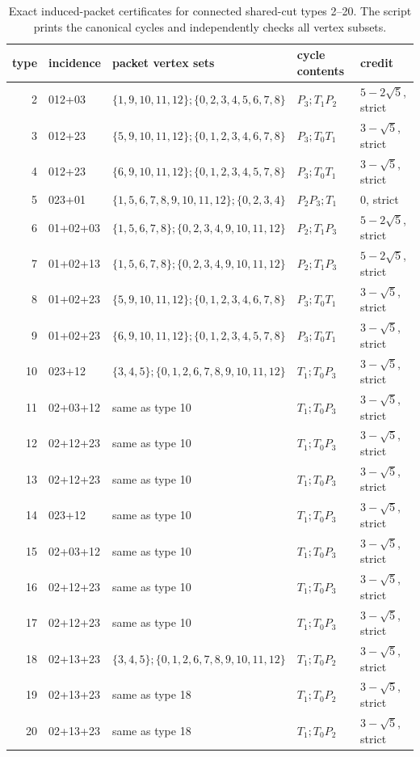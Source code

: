\documentclass[11pt]{article}
\theoremstyle{remark}
\begin{document}
\begin{table}[p]
\centering\scriptsize
\begin{tabular}{rlllp{2.3cm}}
type&incidence&packet vertex sets&cycle contents&credit\\\hline
2&012+03&$\{1,9,10,11,12\};\{0,2,3,4,5,6,7,8\}$&$P_3;T_1P_2$&$5-2\sqrt5$, strict\\
3&012+23&$\{5,9,10,11,12\};\{0,1,2,3,4,6,7,8\}$&$P_3;T_0T_1$&$3-\sqrt5$, strict\\
4&012+23&$\{6,9,10,11,12\};\{0,1,2,3,4,5,7,8\}$&$P_3;T_0T_1$&$3-\sqrt5$, strict\\
5&023+01&$\{1,5,6,7,8,9,10,11,12\};\{0,2,3,4\}$&$P_2P_3;T_1$&$0$, strict\\
6&01+02+03&$\{1,5,6,7,8\};\{0,2,3,4,9,10,11,12\}$&$P_2;T_1P_3$&$5-2\sqrt5$, strict\\
7&01+02+13&$\{1,5,6,7,8\};\{0,2,3,4,9,10,11,12\}$&$P_2;T_1P_3$&$5-2\sqrt5$, strict\\
8&01+02+23&$\{5,9,10,11,12\};\{0,1,2,3,4,6,7,8\}$&$P_3;T_0T_1$&$3-\sqrt5$, strict\\
9&01+02+23&$\{6,9,10,11,12\};\{0,1,2,3,4,5,7,8\}$&$P_3;T_0T_1$&$3-\sqrt5$, strict\\
10&023+12&$\{3,4,5\};\{0,1,2,6,7,8,9,10,11,12\}$&$T_1;T_0P_3$&$3-\sqrt5$, strict\\
11&02+03+12&same as type 10&$T_1;T_0P_3$&$3-\sqrt5$, strict\\
12&02+12+23&same as type 10&$T_1;T_0P_3$&$3-\sqrt5$, strict\\
13&02+12+23&same as type 10&$T_1;T_0P_3$&$3-\sqrt5$, strict\\
14&023+12&same as type 10&$T_1;T_0P_3$&$3-\sqrt5$, strict\\
15&02+03+12&same as type 10&$T_1;T_0P_3$&$3-\sqrt5$, strict\\
16&02+12+23&same as type 10&$T_1;T_0P_3$&$3-\sqrt5$, strict\\
17&02+12+23&same as type 10&$T_1;T_0P_3$&$3-\sqrt5$, strict\\
18&02+13+23&$\{3,4,5\};\{0,1,2,6,7,8,9,10,11,12\}$&$T_1;T_0P_2$&$3-\sqrt5$, strict\\
19&02+13+23&same as type 18&$T_1;T_0P_2$&$3-\sqrt5$, strict\\
20&02+13+23&same as type 18&$T_1;T_0P_2$&$3-\sqrt5$, strict
\end{tabular}
\caption{Exact induced-packet certificates for connected shared-cut types
2--20.  The script prints the canonical cycles and independently checks all
vertex subsets.}
\label{tab:3355}
\end{table}
\end{document}
